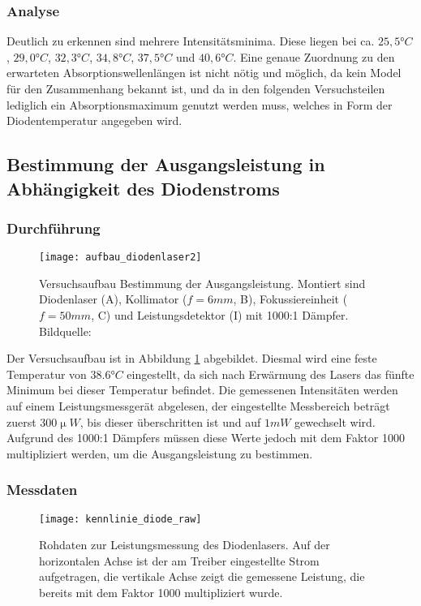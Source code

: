 \documentclass{../Misc/MontavonLaTeX/Montavon}
\newcommand{\fullwidth}{1.0\textwidth}
\begin{document}
\subsubsection{Analyse}
Deutlich zu erkennen sind mehrere Intensitätsminima. Diese liegen bei ca. $25,5 \unit{\degree C}$, $29,0 \unit{\degree C}$, $32,3 \unit{\degree C}$, $34,8 \unit{\degree C}$, $37,5 \unit{\degree C}$ und $40,6 \unit{\degree C}$. Eine genaue Zuordnung zu den erwarteten Absorptionswellenlängen ist nicht nötig und möglich, da kein Model für den Zusammenhang bekannt ist, und da in den folgenden Versuchsteilen lediglich ein Absorptionsmaximum genutzt werden muss, welches in Form der Diodentemperatur angegeben wird.

\subsection{Bestimmung der Ausgangsleistung in Abhängigkeit des Diodenstroms}

\subsubsection{Durchführung}
\begin{figure}[htbp]
\centering
\texttt{[image: aufbau\_diodenlaser2]}
\caption{Versuchsaufbau Bestimmung der Ausgangsleistung. Montiert sind Diodenlaser (A), Kollimator ($f = 6 \unit{mm}$, B), Fokussiereinheit ($f = 50 \unit{mm}$, C) und Leistungsdetektor (I) mit 1000:1 Dämpfer. Bildquelle: \cite[S. 35]{anleitung1}}
\label{fig:aufbau_diodenlaser2}
\end{figure}

Der Versuchsaufbau ist in Abbildung \ref{fig:aufbau_diodenlaser2} abgebildet. Diesmal wird eine feste Temperatur von $38.6 \unit{\degree C}$ eingestellt, da sich nach Erwärmung des Lasers das fünfte Minimum bei dieser Temperatur befindet. Die gemessenen Intensitäten werden auf einem Leistungsmessgerät abgelesen, der eingestellte Messbereich beträgt zuerst $300 \unit{\upmu W}$, bis dieser überschritten ist und auf $1 \unit{mW}$ gewechselt wird. Aufgrund des 1000:1 Dämpfers müssen diese Werte jedoch mit dem Faktor 1000 multipliziert werden, um die Ausgangsleistung zu bestimmen.

\subsubsection{Messdaten}
\begin{figure}[htbp]
\centering
\texttt{[image: kennlinie\_diode\_raw]}
\caption{Rohdaten zur Leistungsmessung des Diodenlasers. Auf der horizontalen Achse ist der am Treiber eingestellte Strom aufgetragen, die vertikale Achse zeigt die gemessene Leistung, die bereits mit dem Faktor 1000 multipliziert wurde.}
\label{fig:kennlinie_diode_raw}
\end{figure}
\end{document}
